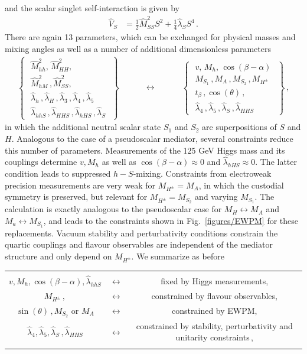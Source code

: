 and the scalar singlet self-interaction is given by 
\begin{align}
\hat{V}_S &= \frac{1}{2} \hat{M}_{SS}^2 S^2 + \frac{1}{4} \hat{\lambda}_S S^4\,.
\end{align}
There are again 13 parameters, which can be exchanged for physical masses and mixing angles as well as a number of additional dimensionless parameters
\begin{align}
\left\{ \,\,\begin{matrix}
\hat M_{hh}^2,\,\hat M_{HH}^2,\\[3pt]
\hat M_{hM}^2\,, \hat M_{SS}^2,\\[3pt]
\hat\lambda_h\,,\hat\lambda_H\,,\hat\lambda_3\,,\hat\lambda_4\,,\hat \lambda_5\\
\hat \lambda_{hhS}\,,\hat \lambda_{HHS} \,, \hat\lambda_{hHS}\,,\hat\lambda_S
\end{matrix}\,\,\right\}\qquad \quad \longleftrightarrow \quad \qquad \left\{ \,\,\begin{matrix}
v,\, M_h,\,\cos(\beta-\alpha)\\[3pt]
M_{S_1}\,, M_A\,, M_{S_2}\,,M_{H^\pm}\\[3pt]
t_\beta\,, \cos(\theta)\,, \\[3pt]
\hat \lambda_4\,,\hat \lambda_{5}\,,\hat \lambda_{S}\,,\hat \lambda_{HHS}
\end{matrix}\,\,\right\}\,,
\end{align}
in which the additional neutral scalar state $S_1$ and $S_2$ are superpositions of $S$ and $H$.
Analogous to the case of a pseudoscalar mediator, several constraints reduce this number of parameters. Measurements of the 125 GeV Higgs mass and its couplings determine $v, M_h$ as well as $\cos(\beta-\alpha)\approx 0$ and $\hat \lambda_{hHS}\approx 0$. The latter condition leads to suppressed $h-S$-mixing. Constraints from electroweak precision measurements are very weak for $M_{H^\pm}=M_A$, in which the custodial symmetry is preserved, but relevant for $M_{H^\pm}=M_{S_2}$ and varying $M_{S_1}$. The calculation is exactly analogous to the pseudoscalar case for $M_H \leftrightarrow M_A$ and $M_a\leftrightarrow M_{S_1}$, and leads to the constraints shown in Fig.~\ref{figures/EWPM} for these replacements. Vacuum stability and perturbativity conditions constrain the quartic couplings and flavour observables are independent of the mediator structure and only depend on $M_{H^\pm}$. We summarize as before 
\newline
\begin{tabular}{cc c}
&&\\
$v, M_h, \cos(\beta-\alpha), \hat{\lambda}_{hhS} $&$\longleftrightarrow$& fixed by Higgs measurements,\\[.3cm]
$M_{H^\pm}\,, $  &$\longleftrightarrow $& constrained by flavour observables,\\[.3cm]
$\sin(\theta)\,, M_{S_2} \,\,\text{or} \,\,M_A$  &$\longleftrightarrow $& constrained by EWPM,\\[.3cm]
$\hat \lambda_4, \hat \lambda_{5}, \hat \lambda_{S}\,,\hat \lambda_{HHS} $ &$\longleftrightarrow $& constrained by stability, perturbativity and unitarity constraints\,,\\[.3cm]
&&
\end{tabular}
